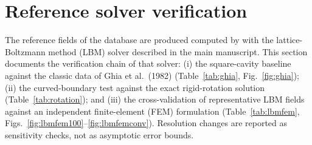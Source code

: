 \documentclass[11pt]{article}
\begin{document}
\section{Reference solver verification}\label{sec:solver}
The reference fields \color{revred}of the database \color{black}are \color{revred}produced \color{revblue}computed\color{black} \color{revred}by \color{revblue}with\color{black} the lattice-Boltzmann
method (LBM) solver described in the main manuscript. This section documents
the verification chain of that solver: (i) the square-cavity baseline against the
classic data of Ghia et al.\ (1982) (Table~\ref{tab:ghia}, Fig.~\ref{fig:ghia});
(ii) the curved-boundary test against the exact rigid-rotation solution
(Table~\ref{tab:rotation}); and (iii) the cross-validation of representative LBM
fields against an independent finite-element (FEM) formulation
(Table~\ref{tab:lbmfem}, Figs.~\ref{fig:lbmfem100}--\ref{fig:lbmfemconv}).
Resolution changes are reported as sensitivity checks, not as asymptotic error
bounds.
\end{document}

